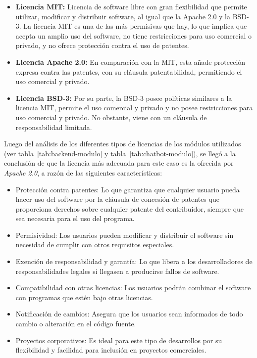 \begin{itemize}
\tightlist
\item
\textbf{Licencia MIT:} Licencia de software libre con gran flexibilidad que permite utilizar, modificar y distribuir software, al igual que la Apache 2.0 y la BSD-3. La licencia MIT es una de las más permisivas que hay, lo que implica que acepta un amplio uso del software, no tiene restricciones para uso comercial o privado, y no ofrece protección contra el uso de patentes.\\

\item
\textbf{Licencia Apache 2.0:} En comparación con la MIT, esta añade protección expresa contra las patentes, con su cláusula patentabilidad, permitiendo el uso comercial y privado.\\
\item
\textbf{Licencia BSD-3:} Por su parte, la BSD-3 posee políticas similares a la licencia MIT, permite el uso comercial y privado y no posee restricciones para uso comercial y privado. No obstante, viene con un cláusula de responsabilidad limitada.\\
\end{itemize}

Luego del análisis de los diferentes tipos de licencias de los módulos utilizados (ver tabla~\ref{tab:backend-modulo} y tabla~\ref{tab:chatbot-modulo}), se llegó a la conclusión de que la licencia más adecuada para este caso es la ofrecida por \emph{Apache 2.0}, a razón de las siguientes características:

\begin{itemize}
\tightlist
\item
Protección contra patentes: Lo que garantiza que cualquier usuario pueda hacer uso del software por la cláusula de concesión de patentes que proporciona derechos sobre cualquier patente del contribuidor, siempre que sea necesaria para el uso del programa.\\
\item
Permisividad: Los usuarios pueden modificar y distribuir el software sin necesidad de cumplir con otros requisitos especiales.\\
\item
Exención de responsabilidad y garantía: Lo que libera a los desarrolladores de responsabilidades legales si llegasen a producirse fallos de software.\\
\item 
Compatibilidad con otras licencias: Los usuarios podrán combinar el software con programas que estén bajo otras licencias.\\
\item 
 Notificación de cambios: Asegura que los usuarios sean informados de todo cambio o alteración en el código fuente.\\
 \item 
 Proyectos corporativos: Es ideal para este tipo de desarrollos por su flexibilidad y facilidad para inclusión en proyectos comerciales.\\
\end{itemize}

